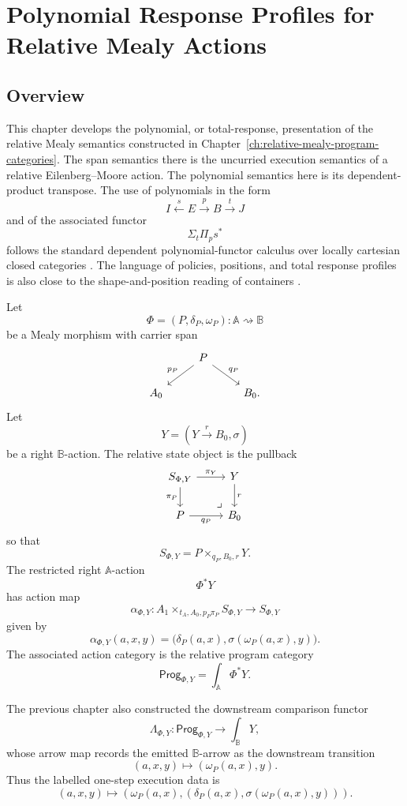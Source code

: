 \chapter{Polynomial Response Profiles for Relative Mealy Actions}
\label{ch:polynomial-relative-mealy-actions}

\section{Overview}
\label{sec:poly-relative-overview}

This chapter develops the polynomial, or total-response, presentation of the
relative Mealy semantics constructed in
Chapter~\ref{ch:relative-mealy-program-categories}.  The span semantics there
is the uncurried execution semantics of a relative Eilenberg--Moore action.
The polynomial semantics here is its dependent-product transpose.  The use of
polynomials in the form
\[
I\xleftarrow{s}E\xrightarrow{p}B\xrightarrow{t}J
\]
and of the associated functor
\[
\Sigma_t\Pi_p s^\ast
\]
follows the standard dependent polynomial-functor calculus over locally
cartesian closed categories \cite{GambinoKock2013Polynomial}.  The language of
policies, positions, and total response profiles is also close to the
shape-and-position reading of containers
\cite{AbbottAltenkirchGhani2005Containers}.

Let
\[
\Phi=(P,\delta_P,\omega_P):\mathbb A\rightsquigarrow\mathbb B
\]
be a Mealy morphism with carrier span
\[
\begin{tikzcd}
& P \arrow[dl,"p_P"'] \arrow[dr,"q_P"] & \\
A_0 && B_0 .
\end{tikzcd}
\]
Let
\[
Y=(Y\xrightarrow{r}B_0,\sigma)
\]
be a right \(\mathbb B\)-action.  The relative state object is the pullback
\[
\begin{tikzcd}
S_{\Phi,Y}
  \arrow[r,"\pi_Y"]
  \arrow[d,"\pi_P"']
&
Y
  \arrow[d,"r"]
\\
P
  \arrow[r,"q_P"']
&
B_0
\arrow[ul,phantom,very near start,"\lrcorner"]
\end{tikzcd}
\]
so that
\[
S_{\Phi,Y}=P\times_{q_P,B_0,r}Y.
\]
The restricted right \(\mathbb A\)-action
\[
\Phi^\ast Y
\]
has action map
\[
\alpha_{\Phi,Y}:
A_1\times_{t_A,A_0,p_P\pi_P}S_{\Phi,Y}
\to S_{\Phi,Y}
\]
given by
\[
\alpha_{\Phi,Y}(a,x,y)
=
\bigl(
\delta_P(a,x),
\sigma(\omega_P(a,x),y)
\bigr).
\]
The associated action category is the relative program category
\[
\mathsf{Prog}_{\Phi,Y}
=
\int_{\mathbb A}\Phi^\ast Y.
\]

The previous chapter also constructed the downstream comparison functor
\[
\Lambda_{\Phi,Y}:
\mathsf{Prog}_{\Phi,Y}\to\int_{\mathbb B}Y,
\]
whose arrow map records the emitted \(\mathbb B\)-arrow as the downstream
transition
\[
(a,x,y)\longmapsto(\omega_P(a,x),y).
\]
Thus the labelled one-step execution data is
\[
(a,x,y)
\longmapsto
\left(
\omega_P(a,x),
\left(
\delta_P(a,x),
\sigma(\omega_P(a,x),y)
\right)
\right).
\]

